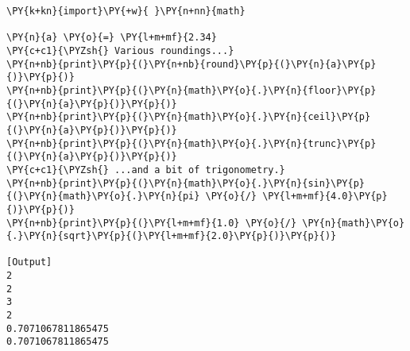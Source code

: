 \begin{Verbatim}[label=\makebox{\href{https://github.com/unipi-physics-labs/statnotes/tree/main/snippy/rounding.py}{https://github.com/.../rounding.py}},commandchars=\\\{\}]
\PY{k+kn}{import}\PY{+w}{ }\PY{n+nn}{math}

\PY{n}{a} \PY{o}{=} \PY{l+m+mf}{2.34}
\PY{c+c1}{\PYZsh{} Various roundings...}
\PY{n+nb}{print}\PY{p}{(}\PY{n+nb}{round}\PY{p}{(}\PY{n}{a}\PY{p}{)}\PY{p}{)}
\PY{n+nb}{print}\PY{p}{(}\PY{n}{math}\PY{o}{.}\PY{n}{floor}\PY{p}{(}\PY{n}{a}\PY{p}{)}\PY{p}{)}
\PY{n+nb}{print}\PY{p}{(}\PY{n}{math}\PY{o}{.}\PY{n}{ceil}\PY{p}{(}\PY{n}{a}\PY{p}{)}\PY{p}{)}
\PY{n+nb}{print}\PY{p}{(}\PY{n}{math}\PY{o}{.}\PY{n}{trunc}\PY{p}{(}\PY{n}{a}\PY{p}{)}\PY{p}{)}
\PY{c+c1}{\PYZsh{} ...and a bit of trigonometry.}
\PY{n+nb}{print}\PY{p}{(}\PY{n}{math}\PY{o}{.}\PY{n}{sin}\PY{p}{(}\PY{n}{math}\PY{o}{.}\PY{n}{pi} \PY{o}{/} \PY{l+m+mf}{4.0}\PY{p}{)}\PY{p}{)}
\PY{n+nb}{print}\PY{p}{(}\PY{l+m+mf}{1.0} \PY{o}{/} \PY{n}{math}\PY{o}{.}\PY{n}{sqrt}\PY{p}{(}\PY{l+m+mf}{2.0}\PY{p}{)}\PY{p}{)}

[Output]
2
2
3
2
0.7071067811865475
0.7071067811865475
\end{Verbatim}
